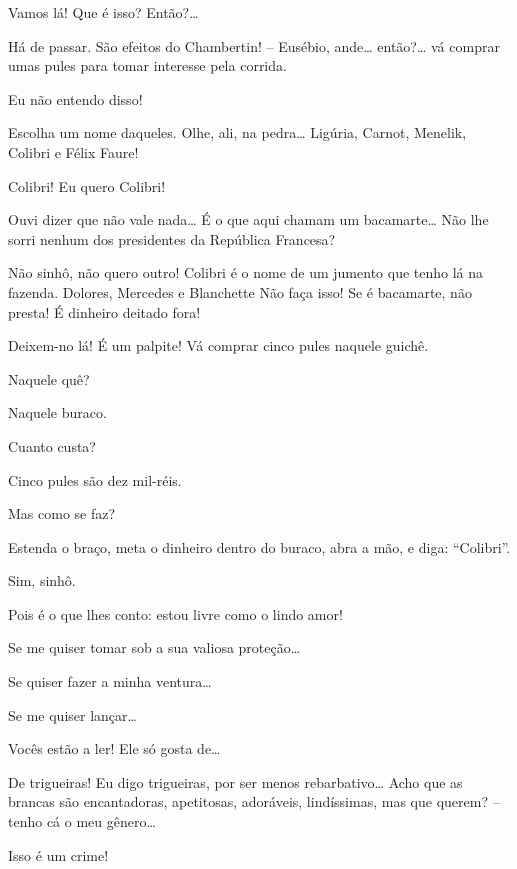  Vamos lá! Que é isso? Então?\ldots{}

 Há de passar. São efeitos do Chambertin! -- Eusébio, ande\ldots{}
então?\ldots{} vá comprar umas pules para tomar interesse pela corrida.

 Eu não entendo disso!

 Escolha um nome daqueles. Olhe, ali, na pedra\ldots{} Ligúria,
Carnot, Menelik, Colibri e Félix Faure!

 Colibri! Eu quero Colibri!

 Ouvi dizer que não vale nada\ldots{} É o que aqui chamam um
bacamarte\ldots{} Não lhe sorri nenhum dos presidentes da República Francesa?

 Não sinhô, não quero outro! Colibri é o nome de um jumento que
tenho lá na fazenda. Dolores, Mercedes e Blanchette  Não faça isso! Se é 
bacamarte, não presta! É dinheiro deitado fora!

 Deixem-no lá! É um palpite! Vá comprar cinco pules naquele guichê.

 Naquele quê?

 Naquele buraco.

 Cuanto custa?

 Cinco pules são dez mil-réis.

 Mas como se faz?

 Estenda o braço, meta o dinheiro dentro do buraco, abra a mão,
e diga: “Colibri”.

 Sim, sinhô. 

 Pois é o que lhes conto: estou livre como o lindo amor!

 Se me quiser tomar sob a sua valiosa proteção\ldots{}

 Se quiser fazer a minha ventura\ldots{}

 Se me quiser lançar\ldots{}

 Vocês estão a ler! Ele só gosta de\ldots{}

  De trigueiras! Eu digo trigueiras, por ser menos
rebarbativo\ldots{} Acho que as brancas são encantadoras, apetitosas, adoráveis,
lindíssimas, mas que querem? -- tenho cá o meu gênero\ldots{}

 Isso é um crime!

